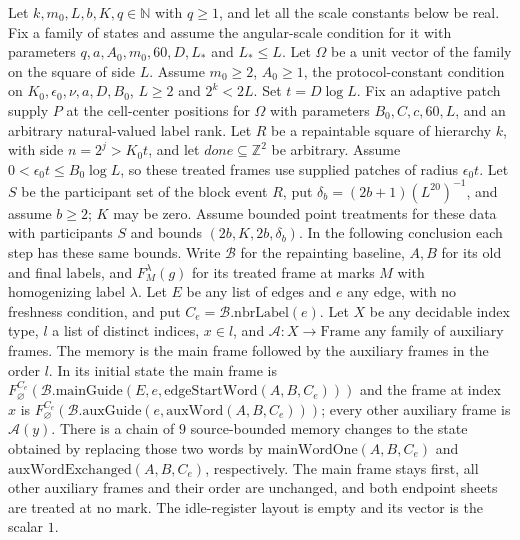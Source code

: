 \begin{lemma}
    \label{thm:peps_protocol_lens_exchange_chain}
    \leanok
    Let $k,m_0,L,b,K,q\in\mathbb N$ with $q\ge1$, and let all the scale
    constants below be real. Fix a family of states and assume the angular-scale
    condition for it with parameters $q,a,A_0,m_0,60,D,L_*$ and $L_*\le L$. Let
    $\Omega$ be a unit vector of the family on the square of side $L$. Assume $m_0\ge2$,
    $A_0\ge1$, the protocol-constant condition on $K_0,\epsilon_0,\nu,a,D,B_0$,
    $L\ge2$ and $2^k<2L$. Set $t=D\log L$. Fix an adaptive patch supply
    $P$ at the cell-center positions for $\Omega$ with parameters
    $B_0,C,c,60,L$, and an arbitrary natural-valued label rank.
    Let $R$ be a repaintable square of hierarchy $k$, with side $n=2^j>K_0t$,
    and let $\mathit{done}\subseteq\mathbb Z^2$ be arbitrary. Assume
    $0<\epsilon_0t\le B_0\log L$, so these treated frames use supplied
    patches of radius $\epsilon_0t$.
    Let $S$ be the participant set of the block event $R$, put
    $\delta_b=(2b+1)(L^{20})^{-1}$, and assume $b\ge2$; $K$ may be zero.
    Assume bounded point treatments for these data with participants $S$ and
    bounds $(2b,K,2b,\delta_b)$. In the following conclusion each step has
    these same bounds. Write $\mathcal B$ for the repainting baseline,
    $A,B$ for its old and final labels, and $F_M^\lambda(g)$ for its treated
    frame at marks $M$ with homogenizing label $\lambda$.
    Let $E$ be any list of edges and $e$ any edge, with no freshness condition,
    and put $C_e=\mathcal B.\mathrm{nbrLabel}(e)$. Let $X$ be any decidable
    index type, $l$ a list of distinct indices, $x\in l$, and
    $\mathcal A:X\to\mathrm{Frame}$ any family of auxiliary frames.
    The memory is the main frame followed by the auxiliary frames in the order
    $l$. In its initial state the main frame is
    $F_\varnothing^{C_e}(\mathcal B.\mathrm{mainGuide}
        (E,e,\mathrm{edgeStartWord}(A,B,C_e)))$ and the frame at index $x$ is
    $F_\varnothing^{C_e}(\mathcal B.\mathrm{auxGuide}
        (e,\mathrm{auxWord}(A,B,C_e)))$; every other auxiliary frame is
    $\mathcal A(y)$. There is a chain of $9$ source-bounded memory changes to
    the state obtained by replacing those two words by
    $\mathrm{mainWordOne}(A,B,C_e)$ and $\mathrm{auxWordExchanged}(A,B,C_e)$,
    respectively. The main frame stays first, all other auxiliary frames and
    their order are unchanged, and both endpoint sheets are treated at no mark.
    The idle-register layout is empty and its vector is the scalar $1$.
\end{lemma}

